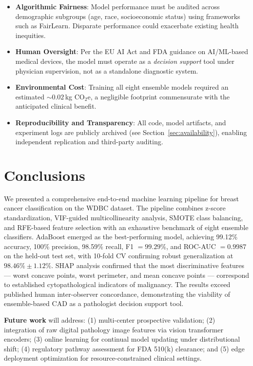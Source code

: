 \documentclass[10pt,letterpaper]{article}
\begin{document}
\begin{itemize}
    \item \textbf{Algorithmic Fairness}: Model performance must be audited across demographic
    subgroups (age, race, socioeconomic status) using frameworks such as FairLearn. Disparate
    performance could exacerbate existing health inequities.
    \item \textbf{Human Oversight}: Per the EU AI Act and FDA guidance on AI/ML-based medical
    devices, the model must operate as a \emph{decision support} tool under physician supervision,
    not as a standalone diagnostic system.
    \item \textbf{Environmental Cost}: Training all eight ensemble models required an estimated
    $\sim 0.02$\,kg CO$_2$e, a negligible footprint commensurate with the anticipated clinical benefit.
    \item \textbf{Reproducibility and Transparency}: All code, model artifacts, and experiment
    logs are publicly archived (see Section~\ref{sec:availability}), enabling independent
    replication and third-party auditing.
\end{itemize}

\section{Conclusions}

We presented a comprehensive end-to-end machine learning pipeline for breast cancer classification
on the WDBC dataset. The pipeline combines z-score standardization, VIF-guided multicollinearity
analysis, SMOTE class balancing, and RFE-based feature selection with an exhaustive benchmark of
eight ensemble classifiers. AdaBoost emerged as the best-performing model, achieving 99.12\%
accuracy, 100\% precision, 98.59\% recall, F1 $= 99.29\%$, and ROC-AUC $= 0.9987$ on the
held-out test set, with 10-fold CV confirming robust generalization at $98.46\% \pm 1.12\%$.
SHAP analysis confirmed that the most discriminative features --- worst concave points, worst
perimeter, and mean concave points --- correspond to established cytopathological indicators of
malignancy. The results exceed published human inter-observer concordance, demonstrating the
viability of ensemble-based CAD as a pathologist decision support tool.

\textbf{Future work} will address: (1) multi-center prospective validation; (2) integration of
raw digital pathology image features via vision transformer encoders; (3) online learning for
continual model updating under distributional shift; (4) regulatory pathway assessment for FDA
510(k) clearance; and (5) edge deployment optimization for resource-constrained clinical settings.
\end{document}

